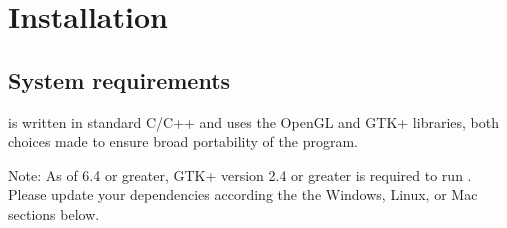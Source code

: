 \section{Installation}

\subsection{System requirements}

\map{} is written in standard C/C++ and uses the OpenGL and GTK+ libraries, 
both choices made to ensure broad portability of the program.

Note: As of \map{} 6.4 or greater, GTK+ version 2.4 or greater is required
to run \map{}.  Please update your dependencies according the the 
Windows, Linux, or Mac sections below.

